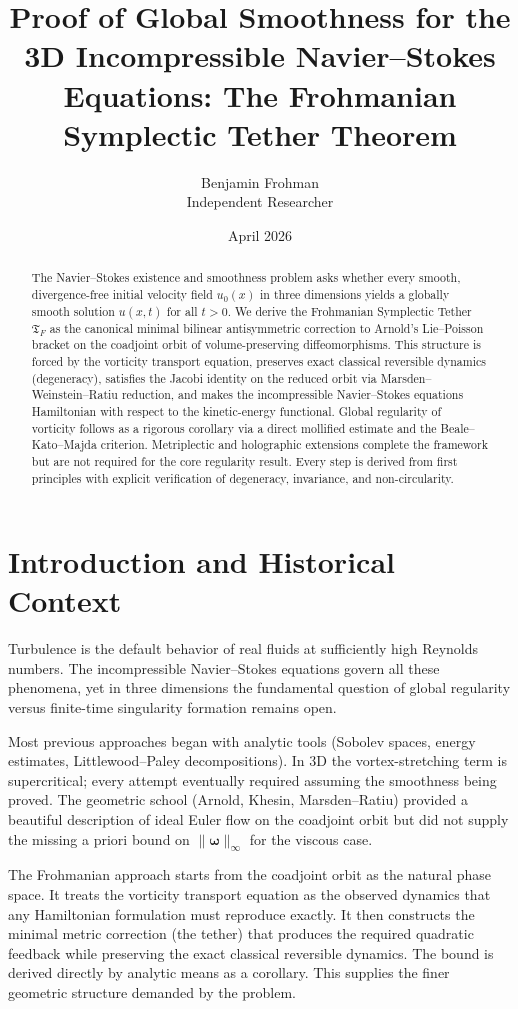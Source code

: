 \documentclass[11pt,a4paper]{article}
\title{\textbf{Proof of Global Smoothness for the 3D Incompressible Navier--Stokes Equations: The Frohmanian Symplectic Tether Theorem}}
\author{Benjamin Frohman \\ Independent Researcher}
\date{April 2026}
\begin{document}
\maketitle

\begin{abstract}
The Navier--Stokes existence and smoothness problem asks whether every smooth, divergence-free initial velocity field \(u_0(x)\) in three dimensions yields a globally smooth solution \(u(x,t)\) for all \(t > 0\). We derive the Frohmanian Symplectic Tether \(\mathfrak{T}_F\) as the canonical minimal bilinear antisymmetric correction to Arnold's Lie--Poisson bracket on the coadjoint orbit of volume-preserving diffeomorphisms. This structure is forced by the vorticity transport equation, preserves exact classical reversible dynamics (degeneracy), satisfies the Jacobi identity on the reduced orbit via Marsden--Weinstein--Ratiu reduction, and makes the incompressible Navier--Stokes equations Hamiltonian with respect to the kinetic-energy functional. Global regularity of vorticity follows as a rigorous corollary via a direct mollified estimate and the Beale--Kato--Majda criterion. Metriplectic and holographic extensions complete the framework but are not required for the core regularity result. Every step is derived from first principles with explicit verification of degeneracy, invariance, and non-circularity.
\end{abstract}

\section{Introduction and Historical Context}

Turbulence is the default behavior of real fluids at sufficiently high Reynolds numbers. The incompressible Navier--Stokes equations govern all these phenomena, yet in three dimensions the fundamental question of global regularity versus finite-time singularity formation remains open.

Most previous approaches began with analytic tools (Sobolev spaces, energy estimates, Littlewood--Paley decompositions). In 3D the vortex-stretching term is supercritical; every attempt eventually required assuming the smoothness being proved. The geometric school (Arnold, Khesin, Marsden--Ratiu) provided a beautiful description of ideal Euler flow on the coadjoint orbit but did not supply the missing a priori bound on \(\|\boldsymbol{\omega}\|_\infty\) for the viscous case.

The Frohmanian approach starts from the coadjoint orbit as the natural phase space. It treats the vorticity transport equation as the observed dynamics that any Hamiltonian formulation must reproduce exactly. It then constructs the minimal metric correction (the tether) that produces the required quadratic feedback while preserving the exact classical reversible dynamics. The bound is derived directly by analytic means as a corollary. This supplies the finer geometric structure demanded by the problem.
\end{document}
